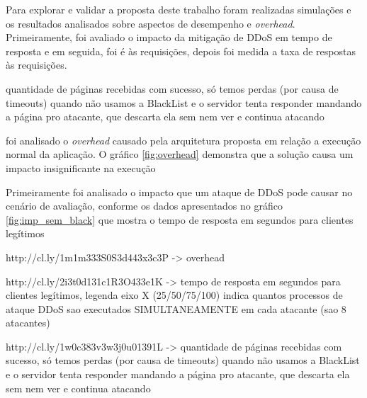 
Para explorar e validar a proposta deste trabalho foram realizadas simulações e os resultados analisados sobre aspectos de desempenho e \emph{overhead}. Primeiramente, foi avaliado o impacto da mitigação de DDoS em tempo de resposta e em seguida, foi é às requisições, depois foi medida a taxa de respostas às requisições. 

quantidade de páginas recebidas com sucesso, só temos perdas (por causa de timeouts) quando não usamos a BlackList e o servidor tenta responder mandando a página pro atacante, que descarta ela sem nem ver e continua atacando


foi analisado o \emph{overhead} causado pela arquitetura proposta em relação a execução normal da aplicação. O gráfico \ref{fig:overhead} demonstra que a solução causa um impacto insignificante na execução 

Primeiramente foi analisado o impacto que um ataque de DDoS pode causar no cenário de avaliação, conforme os dados apresentados no gráfico \ref{fig:imp_sem_black} que mostra o tempo de resposta em segundos para clientes legítimos


http://cl.ly/1m1m333S0S3d443x3c3P -> overhead



http://cl.ly/2i3t0d131c1R3O433e1K -> tempo de resposta em segundos para clientes legítimos, legenda eixo X (25/50/75/100) indica quantos processos de ataque DDoS sao executados SIMULTANEAMENTE em cada atacante (sao 8 atacantes)



http://cl.ly/1w0c383v3w3j0u01391L -> quantidade de páginas recebidas com sucesso, só temos perdas (por causa de timeouts) quando não usamos a BlackList e o servidor tenta responder mandando a página pro atacante, que descarta ela sem nem ver e continua atacando


